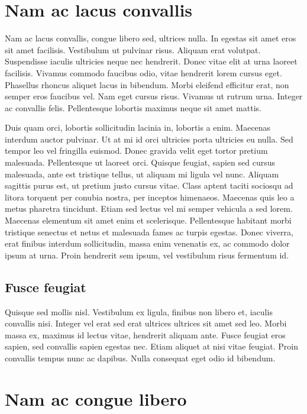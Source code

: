 \documentclass[twocolumn,a4paper,10pt]{article}
\begin{document}
\section{Nam ac lacus convallis}

Nam ac lacus convallis, congue libero sed, ultrices nulla. In egestas sit amet eros sit amet facilisis.
Vestibulum ut pulvinar risus. Aliquam erat volutpat. Suspendisse iaculis ultricies neque nec hendrerit.
Donec vitae elit at urna laoreet facilisis. Vivamus commodo faucibus odio, vitae hendrerit lorem cursus eget.
Phasellus rhoncus aliquet lacus in bibendum. Morbi eleifend efficitur erat, non semper eros faucibus vel.
Nam eget cursus risus. Vivamus ut rutrum urna. Integer ac convallis felis.
Pellentesque lobortis maximus neque sit amet mattis.

Duis quam orci, lobortis sollicitudin lacinia in, lobortis a enim. Maecenas interdum auctor pulvinar.
Ut at mi id orci ultricies porta ultricies eu nulla. Sed tempor leo vel fringilla euismod. Donec gravida velit
eget tortor pretium malesuada. Pellentesque ut laoreet orci. Quisque feugiat, sapien sed cursus malesuada,
ante est tristique tellus, ut aliquam mi ligula vel nunc. Aliquam sagittis purus est, ut pretium justo cursus vitae.
Class aptent taciti sociosqu ad litora torquent per conubia nostra, per inceptos himenaeos.
Maecenas quis leo a metus pharetra tincidunt. Etiam sed lectus vel mi semper vehicula a sed lorem.
Maecenas elementum sit amet enim et scelerisque.
Pellentesque habitant morbi tristique senectus et netus et malesuada fames ac turpis egestas.
Donec viverra, erat finibus interdum sollicitudin, massa enim venenatis ex, ac commodo dolor ipsum at urna.
Proin hendrerit sem ipsum, vel vestibulum risus fermentum id.

\subsection{Fusce feugiat}

Quisque sed mollis nisl. Vestibulum ex ligula, finibus non libero et, iaculis convallis nisi.
Integer vel erat sed erat ultrices ultrices sit amet sed leo. Morbi massa ex, maximus id lectus vitae,
hendrerit aliquam ante. Fusce feugiat eros sapien, sed convallis sapien egestas nec. Etiam aliquet at
nisi vitae feugiat. Proin convallis tempus nunc ac dapibus. Nulla consequat eget odio id bibendum.

\section{Nam ac congue libero}
\end{document}
